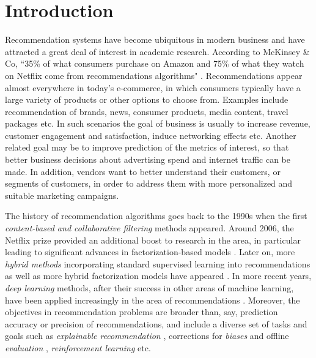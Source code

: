 \section{Introduction}

Recommendation systems have become ubiquitous in modern business and have attracted a great deal of interest in academic research.
According to McKinsey \& Co,
“35\% of what consumers purchase on Amazon and 75\% of what they watch on Netflix come from recommendations algorithms" 
\cite{mckinsey}.
Recommendations appear almost everywhere in today's e-commerce, in which consumers typically have a large variety of products or other
options to choose from. Examples include recommendation of brands, news, consumer products, media content, 
travel packages etc. In such scenarios the goal of business is usually to increase revenue,
customer engagement and satisfaction, induce networking effects etc. Another related goal may be to improve prediction of the metrics of interest, 
so that better business decisions about advertising spend and internet traffic can be made. In addition, vendors want to better understand their customers,
or segments of customers, in order to address them with more personalized and suitable marketing campaigns.

The history of recommendation algorithms goes back to the 1990s \cite{Tapestry, grouplens}
when the first {\em content-based and collaborative filtering} methods appeared.
Around 2006, the Netflix prize \cite{netflix} provided an additional boost to research in the area, in particular leading to significant advances in factorization-based models \cite{bell_lessons,koren2009matrix,SVD++,PMF}.
Later on, more {\em hybrid methods} incorporating standard supervised learning into recommendations as well as more hybrid factorization models have appeared
\cite{rendle,ffm,bpr,pairwise,multiverse}.
In more recent years, {\em deep learning} methods, after their success in other areas of machine learning, have been applied increasingly in the area of recommendations
\cite{PNN,cheng2016wide,lian2018xdeepfm,he2017neural,youtube,nvidia,survival}.
Moreover, the objectives in recommendation problems are broader than, say, prediction accuracy or precision of recommendations, and include a diverse set of tasks and goals such as 
{\em explainable recommendation} \cite{explainable,rl_explainable}, corrections for {\em biases} and offline {\em evaluation} \cite{mnar,offline,debiasing,counterfactual},
{\em reinforcement learning} \cite{rl_explainable,rl,rl_negative} etc.

